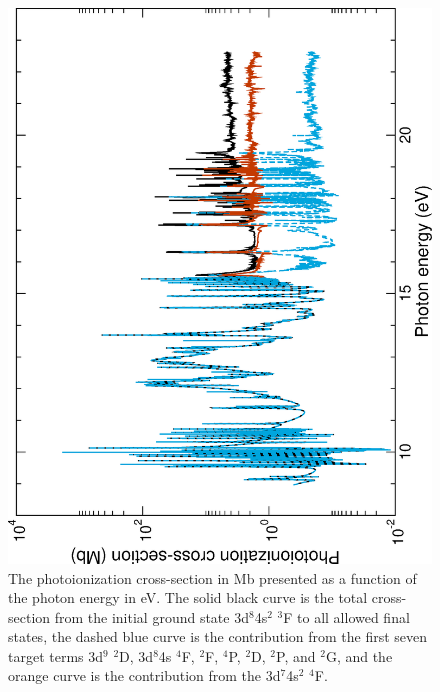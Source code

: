 %
\begin{figure}[h]
\centering
\includegraphics[scale=0.5,angle=-90]{Figures/Conclusions/ni_rmps.eps}
\caption{The photoionization cross-section in Mb presented as a function of the photon energy in eV. The solid black curve is the total cross-section from the initial ground state 3d$^8$4s$^2$ $^3$F to all allowed final states, the dashed blue curve is the contribution from the first seven target terms 3d$^9$ $^2$D, 3d$^8$4s $^4$F, $^2$F, $^4$P, $^2$D, $^2$P, and $^2$G, and the orange curve is the contribution from the 3d$^7$4s$^2$ $^4$F. \label{fig:con_ground}}
\end{figure}
%

